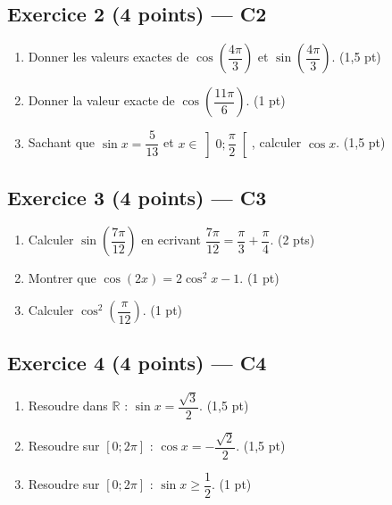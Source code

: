 \subsection*{Exercice 2 \hfill (4 points) — C2}

\begin{enumerate}
  \item Donner les valeurs exactes de $\cos\!\left(\dfrac{4\pi}{3}\right)$ et $\sin\!\left(\dfrac{4\pi}{3}\right)$. \hfill (1,5 pt)
  \item Donner la valeur exacte de $\cos\!\left(\dfrac{11\pi}{6}\right)$. \hfill (1 pt)
  \item Sachant que $\sin x = \dfrac{5}{13}$ et $x \in \left]0;\dfrac{\pi}{2}\right[$, calculer $\cos x$. \hfill (1,5 pt)
\end{enumerate}

\subsection*{Exercice 3 \hfill (4 points) — C3}

\begin{enumerate}
  \item Calculer $\sin\!\left(\dfrac{7\pi}{12}\right)$ en ecrivant $\dfrac{7\pi}{12} = \dfrac{\pi}{3} + \dfrac{\pi}{4}$. \hfill (2 pts)
  \item Montrer que $\cos(2x) = 2\cos^2 x - 1$. \hfill (1 pt)
  \item Calculer $\cos^2\!\left(\dfrac{\pi}{12}\right)$. \hfill (1 pt)
\end{enumerate}

\subsection*{Exercice 4 \hfill (4 points) — C4}

\begin{enumerate}
  \item Resoudre dans $\mathbb{R}$ : $\sin x = \dfrac{\sqrt{3}}{2}$. \hfill (1,5 pt)
  \item Resoudre sur $[0;2\pi]$ : $\cos x = -\dfrac{\sqrt{2}}{2}$. \hfill (1,5 pt)
  \item Resoudre sur $[0;2\pi]$ : $\sin x \geqslant \dfrac{1}{2}$. \hfill (1 pt)
\end{enumerate}

